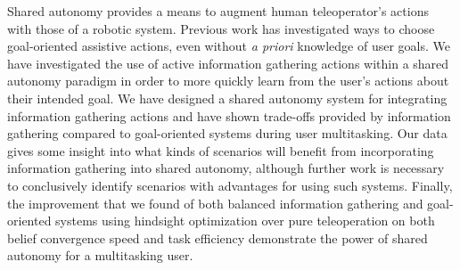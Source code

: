 \documentclass[conference]{IEEEtran}
\begin{document}
Shared autonomy provides a means to augment human teleoperator's actions with those of a robotic system. Previous work has investigated ways to choose goal-oriented assistive actions, even without \textit{a priori} knowledge of user goals. We have investigated the use of active information gathering actions within a shared autonomy paradigm in order to more quickly learn from the user's actions about their intended goal. We have designed a shared autonomy system for integrating information gathering actions and have shown trade-offs provided by information gathering compared to goal-oriented systems during user multitasking. Our data gives some insight into what kinds of scenarios will benefit from incorporating information gathering into shared autonomy, although further work is necessary to conclusively identify scenarios with advantages for using such systems. Finally, the improvement that we found of both balanced information gathering and goal-oriented systems using hindsight optimization over pure teleoperation on both belief convergence speed and task efficiency demonstrate the power of shared autonomy for a multitasking user.



\end{document}
